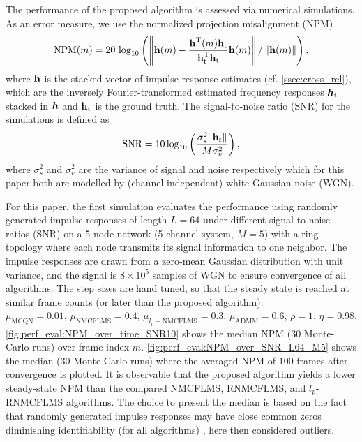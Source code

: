 \documentclass{article}
\begin{document}
The performance of the proposed algorithm is assessed via numerical simulations.
As an error measure, we use the normalized projection misalignment (NPM) \cite{huangClassFrequencydomainAdaptive2003}
\begin{equation}
    \text{NPM}(m) = 20\,\log_{10} \left(\left\| \bm{\mathrm{h}}(m) - \frac{\bm{\mathrm{h}}^{\mathrm{T}} (m) \bm{\mathrm{h}}_{\text{t}}}{\bm{\mathrm{h}}_{\text{t}}^{\mathrm{T}} \bm{\mathrm{h}}_{\text{t}}}\bm{\mathrm{h}}(m) \right\| / \left\|\bm{\mathrm{h}}(m)\right\| \right),
\end{equation}
where \(\bm{\mathrm{h}}\) is the stacked vector of impulse response estimates (cf. \autoref{ssec:cross_rel}), which are the inversely Fourier-transformed estimated frequency responses \({\bm{h}}_i\) stacked in \({\bm{h}}\) and \(\bm{\mathrm{h}}_{\text{t}}\) is the ground truth. The signal-to-noise ratio (SNR) for the simulations is defined as 
\begin{equation}
    \text{SNR} = 10 \log_{10} \left(\frac{\sigma_s^2 \| \bm{\mathrm{h}}_t \|}{M \sigma_v^2} \right),
\end{equation}
where \(\sigma_s^2\) and \(\sigma_v^2\) are the variance of signal and noise respectively which for this paper both are modelled by (channel-independent) white Gaussian noise (WGN).

For this paper, the first simulation evaluates the performance using randomly generated impulse responses of length \(L=64\) under different signal-to-noise ratios (SNR) on a 5-node network (5-channel system, \(M=5\)) with a ring topology where each node transmits its signal information to one neighbor.
The impulse responses are drawn from a zero-mean Gaussian distribution with unit variance, and the signal is \(8\!\times\!10^{5}\) samples of WGN to ensure convergence of all algorithms.
The step sizes are hand tuned, so that the steady state is reached at similar frame counts (or later than the proposed algorithm): \(\mu_{\text{MCQN}}=0.01,\, \mu_{\text{NMCFLMS}}=0.4,\, \mu_{l_p-\text{NMCFLMS}}=0.3,\, \mu_{\text{ADMM}}=0.6,\, \rho=1,\,\eta=0.98 \).
\autoref{fig:perf_eval:NPM_over_time_SNR10} shows the median NPM (30 Monte-Carlo runs) over frame index \(m\).
\autoref{fig:perf_eval:NPM_over_SNR_L64_M5} shows the median (30 Monte-Carlo runs) where the averaged NPM of \(100\) frames after convergence is plotted.
It is observable that the proposed algorithm yields a lower steady-state NPM than the compared NMCFLMS, RNMCFLMS, and \(l_p\)-RNMCFLMS algorithms.
The choice to present the median is based on the fact that randomly generated impulse responses may have close common zeros diminishing identifiability (for all algorithms) \cite{naylorNearCommonZerosBlind2008}, here then considered outliers.
\end{document}
